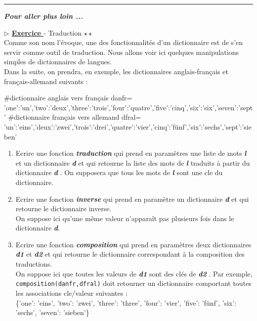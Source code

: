 \documentclass[12pt,french]{article}
\newcounter{npb}
\newcommand{\exo}{
    \stepcounter{npb}
    {\textbf{$\triangleright$ \underline{Exercice \arabic{npb} }}}
}
\begin{document}
\hrule
\begin{center}
	\textbf{\textsl{Pour aller plus loin ...}}
\end{center}
\exo - Traduction $\star \star $\\
Comme son nom l'évoque, une des fonctionnalités d'un dictionnaire est de s'en servir comme outil de traduction. Nous allons voir ici quelques manipulations simples de dictionnaires de langues.\\
Dans la suite, on prendra, en exemple, les dictionnaires anglais-français et français-allemand suivants :\\
\small
\begin{tcolorbox}[enhanced,colback=blue!5!white,colframe=blue!75!black]	
\begin{pyverbatim}
#dictionnaire anglais vers français 
danfr={
'one':'un','two':'deux','three':'trois','four':'quatre','five':'cinq','six':'six','seven':'sept'
}
#dictionnaire français vers allemand
dfral={
'un':'eins','deux':'zwei','trois':'drei','quatre':'vier','cinq':'fünf','six':'sechs','sept':'sieben'
}	
\end{pyverbatim}
\end{tcolorbox}
\normalsize
\begin{enumerate}
	\item Ecrire une fonction \textbf{\textsl{traduction}} qui prend en paramètres une liste de mots \textbf{\textsl{l}} et un dictionnaire \textbf{\textsl{d}} et qui retourne la liste des mots de \textbf{\textsl{l}} traduits à partir du dictionnaire \textbf{\textsl{d}} . On supposera que tous les mots de \textbf{\textsl{l}} sont une cle du dictionnaire.
	\item Ecrire une fonction \textbf{\textsl{inverse}} qui prend en paramètre un dictionnaire \textbf{\textsl{d}} et qui retourne le dictionnaire inverse.\\
	On suppose ici qu'une même valeur n'apparaît pas plusieurs fois dans le dictionnaire \textbf{\textsl{d}}.
	\item Ecrire une fonction \textbf{\textsl{composition}} qui prend en paramètres deux dictionnaires \textbf{\textsl{d1}} et \textbf{\textsl{d2}} et qui retourne le dictionnaire correspondant à la composition des traductions.\\
	On suppose ici que toutes les valeurs de \textbf{\textsl{d1}} sont des clés de \textbf{\textsl{d2}} .
	Par exemple,  \texttt{composition(danfr,dfral)} doit retourner un dictionnaire comportant toutes les associations cle/valeur suivantes :\\
	\{'one': 'eins', 'two': 'zwei', 'three': 'three', 'four': 'vier', 'five': 'fünf', 'six': 'sechs', 'seven': 'sieben'\}
	
	
\end{enumerate}
\end{document}

